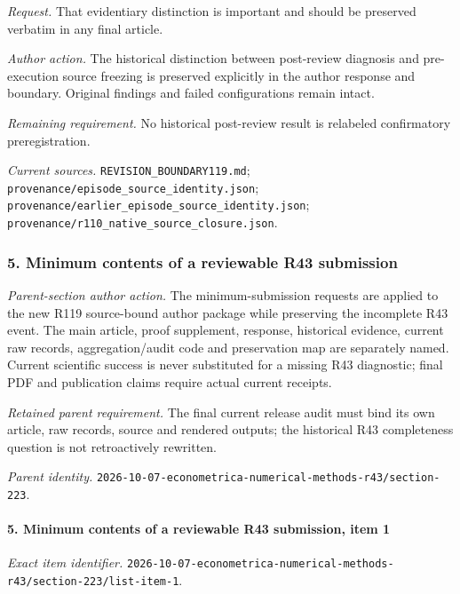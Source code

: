 \par\emph{Request.} That evidentiary distinction is important and should be preserved verbatim in any final article.

\par\emph{Author action.} The historical distinction between post-review diagnosis and pre-execution source freezing is preserved explicitly in the author response and boundary. Original findings and failed configurations remain intact.

\par\emph{Remaining requirement.} No historical post-review result is relabeled confirmatory preregistration.

\par\emph{Current sources.} \nolinkurl{REVISION_BOUNDARY119.md}; \nolinkurl{provenance/episode_source_identity.json}; \nolinkurl{provenance/earlier_episode_source_identity.json}; \nolinkurl{provenance/r110_native_source_closure.json}.

\subsubsection{5. Minimum contents of a reviewable R43 submission}

\emph{Parent-section author action.} The minimum-submission requests are applied to the new R119 source-bound author package while preserving the incomplete R43 event. The main article, proof supplement, response, historical evidence, current raw records, aggregation/\allowbreak{}audit code and preservation map are separately named. Current scientific success is never substituted for a missing R43 diagnostic; final PDF and publication claims require actual current receipts.

\par\emph{Retained parent requirement.} The final current release audit must bind its own article, raw records, source and rendered outputs; the historical R43 completeness question is not retroactively rewritten.

\par\emph{Parent identity.} \nolinkurl{2026-10-07-econometrica-numerical-methods-r43/section-223}.

\paragraph{5. Minimum contents of a reviewable R43 submission, item 1}

\emph{Exact item identifier.} \nolinkurl{2026-10-07-econometrica-numerical-methods-r43/section-223/list-item-1}.

